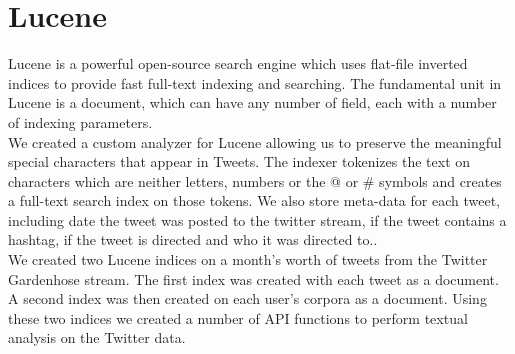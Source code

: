 \section{Lucene}
Lucene is a powerful open-source search engine which uses flat-file inverted indices to provide fast full-text indexing and searching.  The fundamental unit in Lucene is a document, which can have any number of field, each with a number of indexing parameters.\\
We created a custom analyzer for Lucene allowing us to preserve the meaningful special characters that appear in Tweets.  The indexer tokenizes the text on characters which are neither letters, numbers or the @ or \# symbols and creates a full-text search index on those tokens.  We also store meta-data for each tweet, including date the tweet was posted to the twitter stream, if the tweet contains a hashtag, if the tweet is directed and who it was directed to..\\
We created two Lucene indices on a month's worth of tweets from the Twitter Gardenhose stream.  The first index was created with each tweet as a document.  A second index was then created on each user's corpora as a document.  Using these two indices we created a number of API functions to perform textual analysis on the Twitter data.\\

